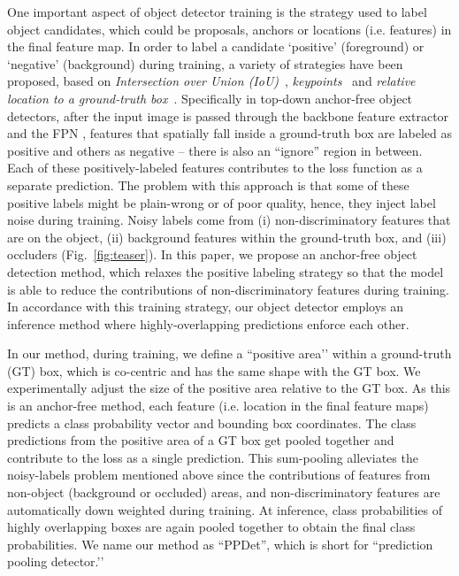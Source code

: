 \documentclass{bmvc2k}
\begin{document}
One important aspect of object detector training is the strategy used to label object candidates, which could be proposals, anchors or locations (i.e. features) in the final feature map. In order to label a candidate ‘positive’ (foreground) or ‘negative’ (background) during training, a variety of  strategies have been proposed, based on \textit{Intersection over Union (IoU)}~\cite{faster, rfcn, ssd, retinanet}, \textit{keypoints}~\cite{cornernet, extremenet, centernet, triplet} and \textit{relative location to a ground-truth box}~\cite{fcos, guided, foveabox}. Specifically in top-down anchor-free object detectors, after the input image is passed through the backbone feature extractor and the FPN \cite{fpn}, features that spatially fall inside a ground-truth box are labeled as positive and others as negative -- there is also an “ignore” region in between. Each of these positively-labeled features contributes to the loss function as a separate prediction. The problem with this approach is that some of these positive labels might be plain-wrong or of poor quality, hence, they inject label noise during training. Noisy labels come from (i) non-discriminatory features that are on the object, (ii) background features within the ground-truth box, and (iii) occluders (Fig.~\ref{fig:teaser}). In this paper, we propose an anchor-free object detection method, which relaxes the positive labeling strategy so that the model is able to reduce the contributions of non-discriminatory features during training. In accordance with this training strategy, our object detector  employs  an inference method where highly-overlapping predictions enforce each other. 


In our method, during training, we define a ``positive area’’ within a ground-truth (GT) box, which is co-centric and has the same shape with the GT box. We experimentally adjust the size of the positive area relative to the GT box. As this is an anchor-free method, each feature (i.e. location in the final feature maps) predicts a class probability vector and bounding box coordinates. The class predictions from the positive area of a GT box get pooled together and contribute to the loss as a single prediction. This sum-pooling alleviates the noisy-labels problem mentioned above since the contributions of features from non-object (background or occluded) areas, and non-discriminatory features are automatically down weighted during training.  
At inference, class probabilities of highly overlapping boxes are again pooled together to obtain the final class probabilities. We name our method as “PPDet”, which is short for ``prediction pooling detector.’’ 
\end{document}
